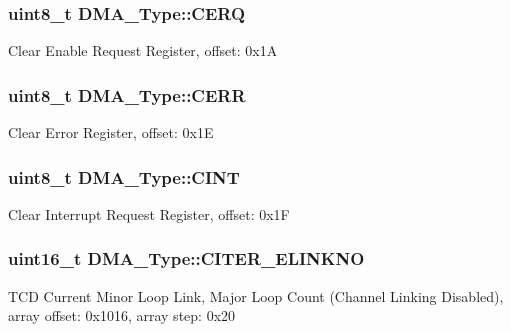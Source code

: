 \subsubsection[{\texorpdfstring{C\+E\+RQ}{CERQ}}]{ uint8\+\_\+t D\+M\+A\+\_\+\+Type\+::\+C\+E\+RQ}\hypertarget{structDMA__Type_aaa87671f75510a3ccf7987c5ef683d40}{}\label{structDMA__Type_aaa87671f75510a3ccf7987c5ef683d40}
Clear Enable Request Register, offset\+: 0x1A 
\subsubsection[{\texorpdfstring{C\+E\+RR}{CERR}}]{ uint8\+\_\+t D\+M\+A\+\_\+\+Type\+::\+C\+E\+RR}\hypertarget{structDMA__Type_a3058b19c540c537a5f8c45bc5da6a5de}{}\label{structDMA__Type_a3058b19c540c537a5f8c45bc5da6a5de}
Clear Error Register, offset\+: 0x1E 
\subsubsection[{\texorpdfstring{C\+I\+NT}{CINT}}]{ uint8\+\_\+t D\+M\+A\+\_\+\+Type\+::\+C\+I\+NT}\hypertarget{structDMA__Type_a6f4b9e922f08762c8913e026e3b34a03}{}\label{structDMA__Type_a6f4b9e922f08762c8913e026e3b34a03}
Clear Interrupt Request Register, offset\+: 0x1F 
\subsubsection[{\texorpdfstring{C\+I\+T\+E\+R\+\_\+\+E\+L\+I\+N\+K\+NO}{CITER_ELINKNO}}]{ uint16\+\_\+t D\+M\+A\+\_\+\+Type\+::\+C\+I\+T\+E\+R\+\_\+\+E\+L\+I\+N\+K\+NO}\hypertarget{structDMA__Type_a96e8d9beb1b516edaf4b2ad84d2bce53}{}\label{structDMA__Type_a96e8d9beb1b516edaf4b2ad84d2bce53}
T\+CD Current Minor Loop Link, Major Loop Count (Channel Linking Disabled), array offset\+: 0x1016, array step\+: 0x20 
